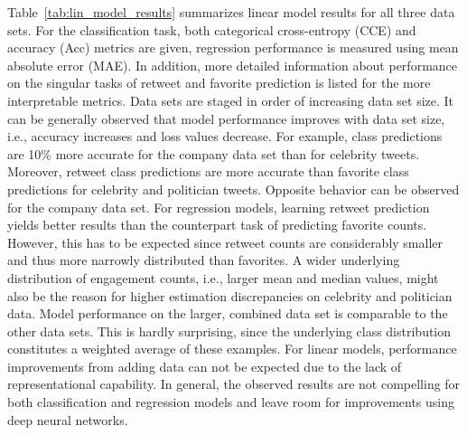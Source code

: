 Table~\ref{tab:lin_model_results} summarizes linear model results for all three
data sets.
For the classification task, both categorical cross-entropy (CCE) and
accuracy (Acc) metrics are given, regression performance is measured using
mean absolute error (MAE).
In addition, more detailed information about performance on the singular tasks of
retweet and favorite prediction is listed for the more interpretable metrics.
Data sets are staged in order of increasing data set size.
It can be generally observed that model performance improves with data set size, i.e.,
accuracy increases and loss values decrease.
For example, class predictions are 10\% more accurate for the company data set
than for celebrity tweets.
Moreover, retweet class predictions are more accurate than favorite class predictions
for celebrity and politician tweets.
Opposite behavior can be observed for the company data set.
For regression models, learning retweet prediction yields better results than
the counterpart task of predicting favorite counts.
However, this has to be expected since retweet counts are considerably smaller
and thus more narrowly distributed than favorites.
A wider underlying distribution of engagement counts, i.e., larger mean and median values, might also be the reason
for higher estimation discrepancies on celebrity and politician data.
Model performance on the larger, combined data set is comparable to the other
data sets.
This is hardly surprising, since the underlying class distribution constitutes a
weighted average of these examples.
For linear models, performance improvements from adding data can not be
expected due to the lack of representational capability.
In general, the observed results are not compelling for both classification and
regression models and leave room for improvements using deep neural networks.

